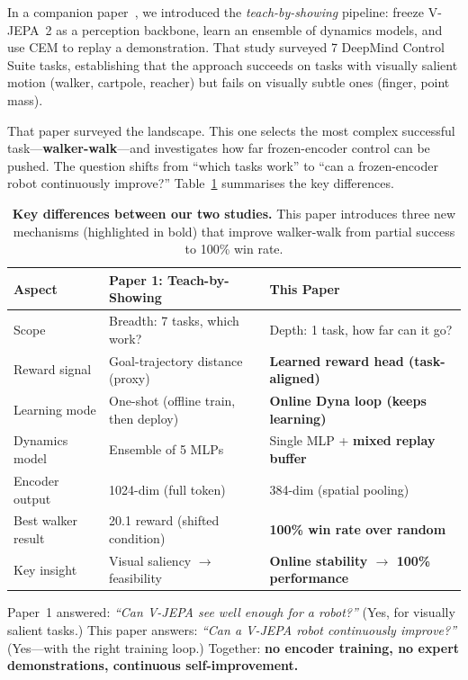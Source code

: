 \documentclass{article}
\begin{document}
In a companion paper~\citep{nguyen2026teachbyshowing}, we introduced the \emph{teach-by-showing} pipeline: freeze V-JEPA~2 as a perception backbone, learn an ensemble of dynamics models, and use CEM to replay a demonstration. That study surveyed 7 DeepMind Control Suite tasks, establishing that the approach succeeds on tasks with visually salient motion (walker, cartpole, reacher) but fails on visually subtle ones (finger, point mass).

That paper surveyed the landscape. This one selects the most complex successful task---\textbf{walker-walk}---and investigates how far frozen-encoder control can be pushed. The question shifts from ``which tasks work'' to ``can a frozen-encoder robot continuously improve?'' Table~\ref{tab:delta} summarises the key differences.

\begin{table}[H]
\centering
\caption{\textbf{Key differences between our two studies.} This paper introduces three new mechanisms (highlighted in bold) that improve walker-walk from partial success to 100\% win rate.}
\label{tab:delta}
\begin{tabular}{p{3.2cm}p{5.2cm}p{5.2cm}}
\toprule
\textbf{Aspect} & \textbf{Paper 1: Teach-by-Showing} & \textbf{This Paper} \\
\midrule
Scope & Breadth: 7 tasks, which work? & Depth: 1 task, how far can it go? \\
Reward signal & Goal-trajectory distance (proxy) & \textbf{Learned reward head (task-aligned)} \\
Learning mode & One-shot (offline train, then deploy) & \textbf{Online Dyna loop (keeps learning)} \\
Dynamics model & Ensemble of 5 MLPs & Single MLP + \textbf{mixed replay buffer} \\
Encoder output & 1024-dim (full token) & 384-dim (spatial pooling) \\
Best walker result & 20.1 reward (shifted condition) & \textbf{100\% win rate over random} \\
Key insight & Visual saliency $\rightarrow$ feasibility & \textbf{Online stability $\rightarrow$ 100\% performance} \\
\bottomrule
\end{tabular}
\end{table}

\begin{insightbox}
\small Paper~1 answered: \emph{``Can V-JEPA see well enough for a robot?''} (Yes, for visually salient tasks.)
This paper answers: \emph{``Can a V-JEPA robot continuously improve?''} (Yes---with the right training loop.)
Together: \textbf{no encoder training, no expert demonstrations, continuous self-improvement.}
\end{insightbox}
\end{document}
